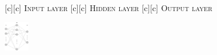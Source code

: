 [c][c] {\footnotesize \textsc{Input layer}}
[c][c] {\footnotesize \textsc{Hidden layer}}
[c][c] {\footnotesize \textsc{Output layer}}

\includegraphics[width=0.08\textwidth]{ann.eps}